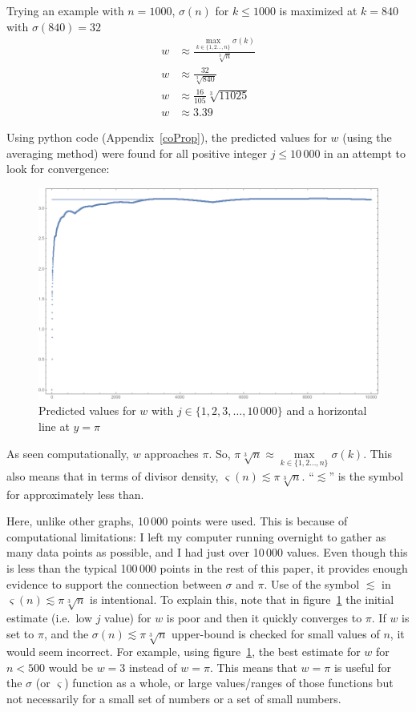 \documentclass[12pt]{article}
\begin{document}
				Trying an example with $n=1000$, $\sigma(n)$ for $k\leq1000$ is maximized at $k=840$ with $\sigma(840)=32$
				\begin{align*}
					w&\approx \frac{\max\limits_{k\in\{1,2\ldots,n\}}\sigma(k)}{\sqrt[3]{n}}\\
					w&\approx \frac{32}{\sqrt[3]{840}}\\
					w&\approx \frac{16}{105}\sqrt[3]{11025}\\
					w&\approx 3.39
				\end{align*}

				\vspace{-0.4cm}Using python code (Appendix~\ref{coProp}), the predicted values for $w$ (using the averaging method) were found for all positive integer $j\leq 10\,000$ in an attempt to look for convergence:
				\begin{figure}[H]
					\includegraphics[width=1\textwidth]{../Images/SupPi.png}
					\caption{Predicted values for $w$ with $j\in\{1,2,3,\ldots,10\,000\}$ and a horizontal line at $y=\pi$\label{pi}}
				\end{figure}
				As seen computationally, $w$ approaches $\pi$. So, $\pi\sqrt[3]{n}\approx \max\limits_{k\in\{1,2\ldots,n\}}\sigma(k)$. This also means that in terms of divisor density, $\varsigma(n)\lesssim \pi\sqrt[3]{n}$. ``$\lesssim$'' is the symbol for approximately less than.

				Here, unlike other graphs, 10\,000 points were used. This is because of computational limitations: I left my computer running overnight to gather as many data points as possible, and I had just over 10\,000 values. Even though this is less than the typical 100\,000 points in the rest of this paper, it provides enough evidence to support the connection between $\sigma$ and $\pi$.
\newpage
				Use of the symbol $\lesssim$ in $\varsigma(n)\lesssim \pi\sqrt[3]{n}$ is intentional. To explain this, note that in figure~\ref{pi} the initial estimate (i.e.\, low $j$ value) for $w$ is poor and then it quickly converges to $\pi$. If $w$ is set to $\pi$, and the $\sigma(n)\lesssim\pi\sqrt[3]{n}$ upper-bound is checked for small values of $n$, it would seem incorrect. For example, using figure~\ref{pi}, the best estimate for $w$ for $n<500$ would be $w=3$ instead of $w=\pi$. This means that $w=\pi$ is useful for the $\sigma$ (or $\varsigma$) function as a whole, or large values/ranges of those functions but not necessarily for a small set of numbers or a set of small numbers.
\end{document}

